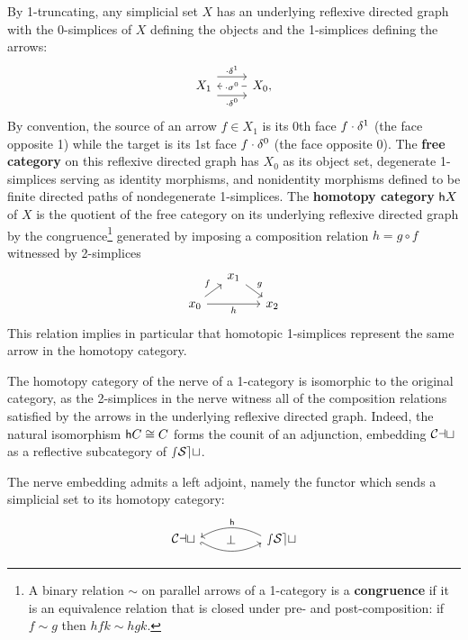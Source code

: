    \begin{defn}\label{defn:homotopy-cat}
   By 1-truncating, any simplicial set $X$ has an underlying reflexive directed graph with the 0-simplices of $X$ defining the objects and the 1-simplices defining the arrows:
   \[
   \begin{tikzcd}
   X_1 \arrow[r, shift left=.75em, "\cdot\face^1"] \arrow[r, shift right=.75em, "\cdot\face^0"'] & X_0, \arrow[l, "\cdot\degen^0" description]
   \end{tikzcd}
   \]
    By convention, the source of an arrow $f \in X_1$ is its 0th face $f \cdot \delta^1$ (the face opposite 1) while the target is its 1st face $f \cdot \delta^0$ (the face opposite 0). The \textbf{free category} on this reflexive directed graph has $X_0$ as its object set, degenerate 1-simplices serving as identity morphisms, and nonidentity morphisms defined to be finite directed paths of nondegenerate 1-simplices. The \textbf{homotopy category} ${\mathord{\mathsf{h}}}{X}$ of $X$ is the quotient of the free category on its underlying reflexive directed graph by the congruence\footnote{A binary relation $\sim$ on parallel arrows of a 1-category is a \textbf{congruence} if it is an equivalence relation that is closed under pre- and post-composition: if $f \sim g$ then $hfk \sim hgk$.} generated by imposing a composition relation $h = g \circ f$ witnessed by 2-simplices
   \[
   \begin{tikzcd}[row sep=small, column sep=small]
   & x_1 \arrow[dr, "g"] \\ x_0 \arrow[ur, "f"] \arrow[rr, "h"'] & & x_2
   \end{tikzcd}
   \]
   This relation implies in particular that homotopic 1-simplices represent the same arrow in the homotopy category.
   \end{defn}

   The homotopy category of the nerve of a 1-category is isomorphic to the original category, as the 2-simplices in the nerve witness all of the composition relations satisfied by the arrows in the underlying reflexive directed graph. Indeed, the natural isomorphism ${\mathord{\mathsf{h}}}{C} \cong C$ forms the counit of an adjunction, embedding ${\mathord{\mathcal{Cat}}}$ as a reflective subcategory of ${\mathord{\mathcal{sSet}}}$.

   \begin{prop}\label{prop:ho-nerve-adjunction} The nerve embedding admits a left adjoint, namely the functor which sends a simplicial set to its homotopy category:
   \[
   \begin{tikzcd}[column sep=huge]
     \Cat \arrow[r, start anchor=353, end anchor=190, bend right, hook'] \arrow[r, phantom, "\bot"] & \sSet \arrow[l, start anchor=170, end anchor=7, bend right, "\ho"' pos=.48]
   \end{tikzcd}
   \]
   \end{prop}

